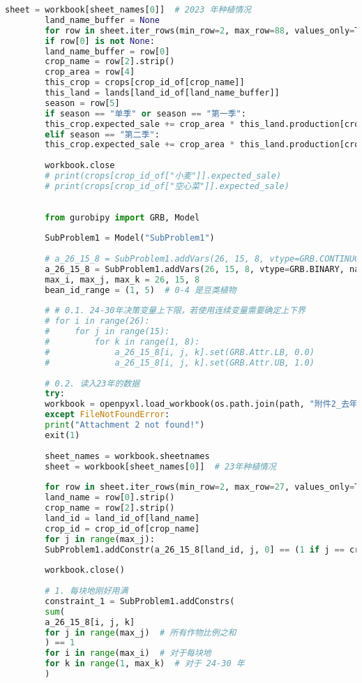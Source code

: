 \documentclass[a4paper]{article}
\begin{document}
\begin{lstlisting}[language=python,columns=fullflexible,frame=shadowbox]
		sheet = workbook[sheet_names[0]]  # 2023 年种植情况
		land_name_buffer = None
		for row in sheet.iter_rows(min_row=2, max_row=88, values_only=True):
		if row[0] is not None:
		land_name_buffer = row[0]
		crop_name = row[2].strip()
		crop_area = row[4]
		this_crop = crops[crop_id_of[crop_name]]
		this_land = lands[land_id_of[land_name_buffer]]
		season = row[5]
		if season == "单季" or season == "第一季":
		this_crop.expected_sale += crop_area * this_land.production[crop_id_of[crop_name], 0]
		elif season == "第二季":
		this_crop.expected_sale += crop_area * this_land.production[crop_id_of[crop_name], 1]
		
		workbook.close
		# print(crops[crop_id_of["小麦"]].expected_sale)
		# print(crops[crop_id_of["空心菜"]].expected_sale)
		
		
		from gurobipy import GRB, Model
		
		SubProblem1 = Model("SubProblem1")
		
		# a_26_15_8 = SubProblem1.addVars(26, 15, 8, vtype=GRB.CONTINUOUS, name='a')  # 地，物，年
		a_26_15_8 = SubProblem1.addVars(26, 15, 8, vtype=GRB.BINARY, name='a')  # 地，物，年
		max_i, max_j, max_k = 26, 15, 8
		bean_id_range = (1, 5)  # 0-4 是豆类植物
		
		# # 0.1. 24-30年决策变量上下限，若使用连续变量需要确定上下界
		# for i in range(26):
		#     for j in range(15):
		#         for k in range(1, 8):
		#             a_26_15_8[i, j, k].set(GRB.Attr.LB, 0.0)
		#             a_26_15_8[i, j, k].set(GRB.Attr.UB, 1.0)
		
		# 0.2. 读入23年的数据
		try:
		workbook = openpyxl.load_workbook(os.path.join(path, "附件2_去年作物与收成情况.xlsx"))
		except FileNotFoundError:
		print("Attachment 2 not found!")
		exit(1)
		
		sheet_names = workbook.sheetnames
		sheet = workbook[sheet_names[0]]  # 23年种植情况
		
		for row in sheet.iter_rows(min_row=2, max_row=27, values_only=True):
		land_name = row[0].strip()
		crop_name = row[2].strip()
		land_id = land_id_of[land_name]
		crop_id = crop_id_of[crop_name]
		for j in range(max_j):
		SubProblem1.addConstr(a_26_15_8[land_id, j, 0] == (1 if j == crop_id else 0))
		
		workbook.close()
		
		# 1. 每块地刚好用满
		constraint_1 = SubProblem1.addConstrs(
		sum(
		a_26_15_8[i, j, k]
		for j in range(max_j)  # 所有作物比例之和
		) == 1
		for i in range(max_i)  # 对于每块地
		for k in range(1, max_k)  # 对于 24-30 年
		)
		

\end{lstlisting}
\end{document}
